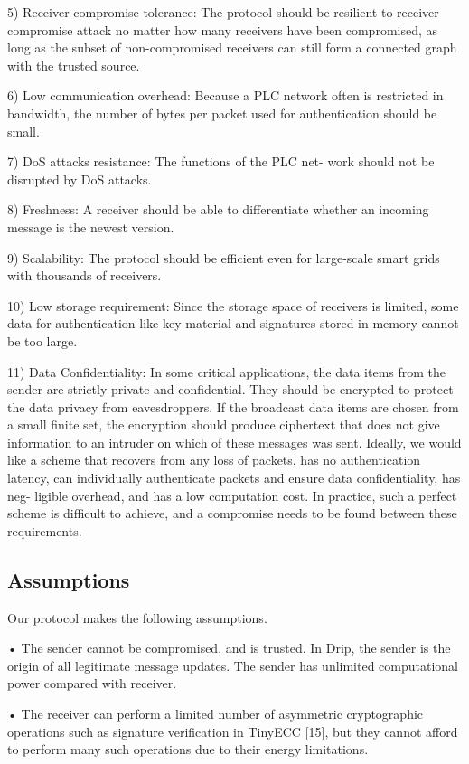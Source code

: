 \documentclass[10pt, conference, compsocconf]{IEEEtran}
\begin{document}
5) Receiver compromise tolerance: The protocol should be
resilient to receiver compromise attack no matter how
many receivers have been compromised, as long as the
subset of non-compromised receivers can still form a
connected graph with the trusted source.

6) Low communication overhead: Because a PLC network
often is restricted in bandwidth, the number of bytes per
packet used for authentication should be small.

7) DoS attacks resistance: The functions of the PLC net-
work should not be disrupted by DoS attacks.

8) Freshness: A receiver should be able to differentiate
whether an incoming message is the newest version.

9) Scalability: The protocol should be efficient even for
large-scale smart grids with thousands of receivers.

10) Low storage requirement: Since the storage space of
receivers is limited, some data for authentication like
key material and signatures stored in memory cannot be
too large.

11) Data Confidentiality: In some critical applications, the
data items from the sender are strictly private and
confidential. They should be encrypted to protect the
data privacy from eavesdroppers. If the broadcast data
items are chosen from a small finite set, the encryption
should produce ciphertext that does not give information
to an intruder on which of these messages was sent.
Ideally, we would like a scheme that recovers from any
loss of packets, has no authentication latency, can individually
authenticate packets and ensure data confidentiality, has neg-
ligible overhead, and has a low computation cost. In practice,
such a perfect scheme is difficult to achieve, and a compromise
needs to be found between these requirements.
\subsection{Assumptions}
Our protocol makes the following assumptions.

• The sender cannot be compromised, and is trusted. In
Drip, the sender is the origin of all legitimate message
updates. The sender has unlimited computational power
compared with receiver.

• The receiver can perform a limited number of asymmetric
cryptographic operations such as signature verification in
TinyECC [15], but they cannot afford to perform many
such operations due to their energy limitations.
\end{document}
